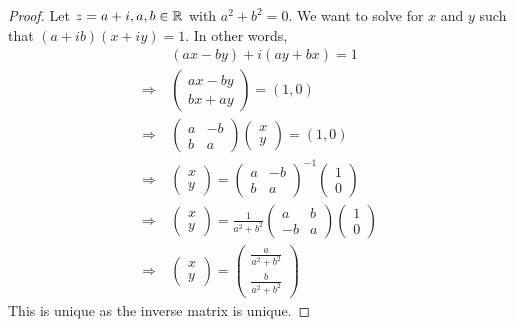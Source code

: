 \documentclass[11pt]{article}
\begin{document}
\begin{proof}
	Let $z = a + i, a,b \in \mathbb{R}$ with $a^2 + b^2 = 0$. We want to solve for $x$
	and $y$ such that $(a + ib)(x + iy) = 1$. In other words,
	\begin{align*}
		&\> (ax - by) + i(ay + bx) = 1\\
		\Rightarrow &\>
		\begin{pmatrix}
			ax - by \\ bx + ay
		\end{pmatrix}
		= (1,0)\\
		\Rightarrow &\>
		\begin{pmatrix}
			a & -b\\
			b & a
		\end{pmatrix}
		\begin{pmatrix}
			x \\ y
		\end{pmatrix}
		= (1,0)\\
		\Rightarrow &\>
		\begin{pmatrix}
			x \\ y
		\end{pmatrix}
		=
		\begin{pmatrix}
			a & -b\\
			b & a
		\end{pmatrix}^{-1}
		\begin{pmatrix}
			1 \\ 0
		\end{pmatrix}\\
		\Rightarrow &\>
		\begin{pmatrix}
			x \\ y
		\end{pmatrix}
		=
		\frac{1}{a^2 + b^2}
		\begin{pmatrix}
			a & b\\
			-b & a
		\end{pmatrix}
		\begin{pmatrix}
			1 \\ 0
		\end{pmatrix}\\
		\Rightarrow &\>
		\begin{pmatrix}
			x \\ y
		\end{pmatrix}
		=
		\begin{pmatrix}
			\frac{a}{a^2 + b^2} \\ \frac{b}{a^2 + b^2}
		\end{pmatrix}
	\end{align*}
	This is unique as the inverse matrix is unique.
\end{proof}
\end{document}
